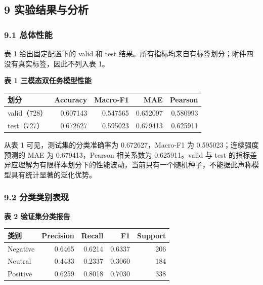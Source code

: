 \documentclass[
  12pt,
  a4paper,
]{ctexart}
\begin{document}
\hypertarget{ux5b9eux9a8cux7ed3ux679cux4e0eux5206ux6790}{%
\subsection{9
实验结果与分析}\label{ux5b9eux9a8cux7ed3ux679cux4e0eux5206ux6790}}

\hypertarget{ux603bux4f53ux6027ux80fd}{%
\subsubsection{9.1 总体性能}\label{ux603bux4f53ux6027ux80fd}}

表 1 给出固定配置下的 valid 和 test
结果。所有指标均来自有标签划分；附件四没有真实标签，因此不列入表 1。

\textbf{表 1 三模态双任务模型性能}

\begin{longtable}[]{@{}lrrrr@{}}
\toprule
划分 & Accuracy & Macro-F1 & MAE & Pearson \\
\midrule
\endhead
valid（728） & 0.607143 & 0.547565 & 0.652097 & 0.580993 \\
test（727） & 0.672627 & 0.595023 & 0.679413 & 0.625911 \\
\bottomrule
\end{longtable}

从表 1 可见，测试集的分类准确率为 0.672627，Macro-F1 为
0.595023；连续强度预测的 MAE 为 0.679413，Pearson 相关系数为
0.625911。valid 与 test
的指标差异应理解为有限样本划分下的性能波动，当前只有一个随机种子，不能据此声称模型具有统计显著的泛化优势。

\hypertarget{ux5206ux7c7bux7c7bux522bux8868ux73b0}{%
\subsubsection{9.2
分类类别表现}\label{ux5206ux7c7bux7c7bux522bux8868ux73b0}}

\textbf{表 2 验证集分类报告}

\begin{longtable}[]{@{}lrrrr@{}}
\toprule
类别 & Precision & Recall & F1 & Support \\
\midrule
\endhead
Negative & 0.6465 & 0.6214 & 0.6337 & 206 \\
Neutral & 0.4433 & 0.2337 & 0.3060 & 184 \\
Positive & 0.6259 & 0.8018 & 0.7030 & 338 \\
\bottomrule
\end{longtable}
\end{document}
